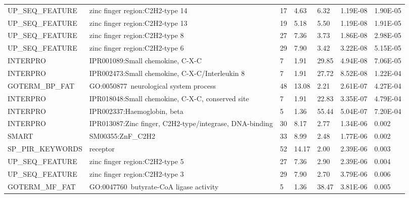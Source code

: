 \documentclass[a4paper,11pt,oneside]{book}
\begin{document}
{\begin{longtable}{lllllll}
UP\_SEQ\_FEATURE  & zinc finger region:C2H2-type 14                                 & 17    & 4.63  & 6.32            & 1.19E-08 & 1.90E-05 \\
UP\_SEQ\_FEATURE  & zinc finger region:C2H2-type 13                                 & 19    & 5.18  & 5.50            & 1.19E-08 & 1.91E-05 \\
UP\_SEQ\_FEATURE  & zinc finger region:C2H2-type 8                                  & 27    & 7.36  & 3.73            & 1.86E-08 & 2.98E-05 \\
UP\_SEQ\_FEATURE  & zinc finger region:C2H2-type 6                                  & 29    & 7.90  & 3.42            & 3.22E-08 & 5.15E-05 \\
INTERPRO          & IPR001089:Small chemokine, C-X-C                                & 7     & 1.91  & 29.85           & 4.94E-08 & 7.06E-05 \\
INTERPRO          & IPR002473:Small chemokine, C-X-C/Interleukin 8                  & 7     & 1.91  & 27.72           & 8.52E-08 & 1.22E-04 \\
GOTERM\_BP\_FAT   & GO:0050877~neurological system process                          & 48    & 13.08 & 2.21            & 2.61E-07 & 4.27E-04 \\
INTERPRO          & IPR018048:Small chemokine, C-X-C, conserved site                & 7     & 1.91  & 22.83           & 3.35E-07 & 4.79E-04 \\
INTERPRO          & IPR002337:Haemoglobin, beta                                     & 5     & 1.36  & 55.44           & 5.04E-07 & 7.20E-04 \\
INTERPRO          & IPR013087:Zinc finger, C2H2-type/integrase, DNA-binding         & 30    & 8.17  & 2.77            & 1.34E-06 & 0.002    \\
SMART             & SM00355:ZnF\_C2H2                                               & 33    & 8.99  & 2.48            & 1.77E-06 & 0.002    \\
SP\_PIR\_KEYWORDS & receptor                                                        & 52    & 14.17 & 2.00            & 2.39E-06 & 0.003    \\
UP\_SEQ\_FEATURE  & zinc finger region:C2H2-type 5                                  & 27    & 7.36  & 2.90            & 2.39E-06 & 0.004    \\
UP\_SEQ\_FEATURE  & zinc finger region:C2H2-type 3                                  & 29    & 7.90  & 2.70            & 3.79E-06 & 0.006    \\
GOTERM\_MF\_FAT   & GO:0047760~butyrate-CoA ligase activity                         & 5     & 1.36  & 38.47           & 3.81E-06 & 0.005    \\

\end{longtable}}
\end{document}

